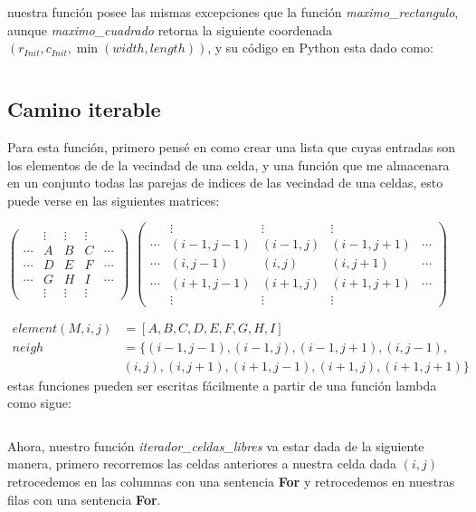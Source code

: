 \documentclass{article}
\begin{document}
	nuestra función posee las mismas excepciones que la función \textit{maximo\_rectangulo}, aunque \textit{maximo\_cuadrado} retorna la siguiente coordenada  $(r_{Init},c_{Init},\min{(width, length)})$, y su código en Python esta dado como:\newpage
	\inputminted{python}{codigos/maximo_cuadrado.py}
	\subsection*{Camino iterable}
	Para esta función, primero pensé en como crear una lista que cuyas entradas son los elementos de de la vecindad de una celda, y una función que me almacenara en un conjunto todas las parejas de indices de las vecindad de una celdas, esto puede verse en las siguientes matrices:\\
	\begin{center}
			$\begin{pmatrix}
		& \vdots&\vdots&\vdots& \\ 
		\cdots & A&B&C&\cdots\\
		\cdots & D&E&F&\cdots\\
		\cdots & G&H&I&\cdots\\
		& \vdots&\vdots&\vdots& 
		\end{pmatrix} $
		\hspace{2pc}
		$\begin{pmatrix}
		& \vdots&\vdots&\vdots& \\ 
		\cdots & (i-1,j-1)&(i-1,j)&(i-1,j+1)&\cdots\\
		\cdots & (i,j-1)&(i,j)&(i,j+1)&\cdots\\
		\cdots & (i+1,j-1)&(i+1,j)&(i+1,j+1)&\cdots\\
		& \vdots&\vdots&\vdots& 
		\end{pmatrix} $
	\end{center}
	\begin{align*}
		element(M,i,j)&=[A,B,C,D,E,F,G,H,I]\\
		neigh &=\{(i-1,j-1),(i-1,j),(i-1,j+1),(i,j-1),\\&(i,j),(i,j+1),(i+1,j-1),(i+1,j),(i+1,j+1)\}
	\end{align*}
	estas funciones pueden ser escritas fácilmente a partir de una función lambda como sigue:
	\inputminted{python}{codigos/lambda.py}
	Ahora, nuestro función \textit{iterador\_celdas\_libres} va estar dada de la siguiente manera, primero recorremos las celdas anteriores a nuestra celda dada $(i,j)$ retrocedemos en las columnas con una sentencia \textbf{For} y retrocedemos en nuestras filas con una sentencia \textbf{For}.\\  \\
\end{document}

